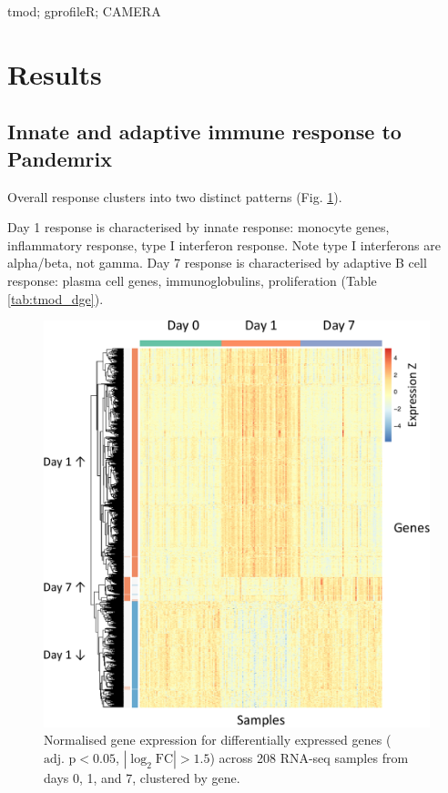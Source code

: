 tmod; gprofileR; CAMERA

\section{Results}

\subsection{Innate and adaptive immune response to Pandemrix}

Overall response clusters into two distinct patterns (Fig. \ref{fig:dge_heatmap}).

Day 1 response is characterised by innate response: monocyte genes, inflammatory response, type I interferon response.
Note type I interferons are alpha/beta, not gamma.
Day 7 response is characterised by adaptive B cell response: plasma cell genes, immunoglobulins, proliferation (Table \ref{tab:tmod_dge}).

\begin{figure}
    \includegraphics[width=1.0\textwidth]{./mainmatter/figures/chapter_02/graphics/plot_dge_eqtl.heatmap_dge.annotated-crop.pdf}
    \caption{Normalised gene expression for differentially expressed genes ($\text{adj. p} < 0.05$, $\left|\log_2\text{FC}\right| > 1.5$) across 208 RNA-seq samples from days 0, 1, and 7, clustered by gene.}
    \label{fig:dge_heatmap}
\end{figure}

